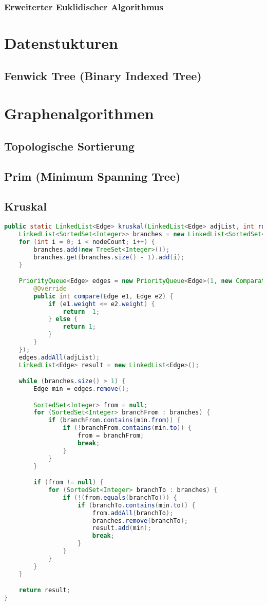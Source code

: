 \documentclass[10pt,a4paper,ngerman,oneside,
]{article}
\begin{document}
\subsubsection{Erweiterter Euklidischer Algorithmus}


\section{Datenstukturen}
\subsection{Fenwick Tree (Binary Indexed Tree)}


\section{Graphenalgorithmen}
\subsection{Topologische Sortierung}

\subsection{Prim (Minimum Spanning Tree)}

\subsection{Kruskal}
\begin{lstlisting}[language=java]
public static LinkedList<Edge> kruskal(LinkedList<Edge> adjList, int root, int nodeCount) {
	LinkedList<SortedSet<Integer>> branches = new LinkedList<SortedSet<Integer>>();
	for (int i = 0; i < nodeCount; i++) {
		branches.add(new TreeSet<Integer>());
		branches.get(branches.size() - 1).add(i);
	}

	PriorityQueue<Edge> edges = new PriorityQueue<Edge>(1, new Comparator<Edge>() {
		@Override
		public int compare(Edge e1, Edge e2) {
			if (e1.weight <= e2.weight) {
				return -1;
			} else {
				return 1;
			}
		}
	});
	edges.addAll(adjList);
	LinkedList<Edge> result = new LinkedList<Edge>();

	while (branches.size() > 1) {
		Edge min = edges.remove();

		SortedSet<Integer> from = null;
		for (SortedSet<Integer> branchFrom : branches) {
			if (branchFrom.contains(min.from)) {
				if (!branchFrom.contains(min.to)) {
					from = branchFrom;
					break;
				}
			}
		}

		if (from != null) {
			for (SortedSet<Integer> branchTo : branches) {
				if (!(from.equals(branchTo))) {
					if (branchTo.contains(min.to)) {
						from.addAll(branchTo);
						branches.remove(branchTo);
						result.add(min);
						break;
					}
				}
			}
		}
	}

	return result;
}		
\end{lstlisting}
\end{document}
